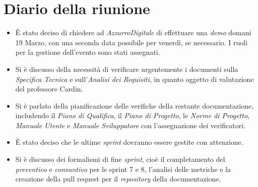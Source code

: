 
\section{Diario della riunione}

\begin{itemize}
    \item È stato deciso di chiedere ad \emph{AzzurroDigitale} di effettuare una \emph{demo} domani 19 Marzo, con una seconda data possibile per venerdì, se necessario. I ruoli per la gestione dell'evento sono stati assegnati.
    \item Si è discusso della necessità di verificare urgentemente i documenti sulla \emph{Specifica Tecnica} e sull'\emph{Analisi dei Requisiti}, in quanto oggetto di valutazione del professore Cardin.
    \item Si è parlato della pianificazione delle verifiche della restante documentazione, includendo il \emph{Piano di Qualifica}, il \emph{Piano di Progetto}, le \emph{Norme di Progetto}, \emph{Manuale Utente} e \emph{Manuale Sviluppatore} con l'assegnazione dei verificatori.
    \item È stato deciso che le ultime \emph{sprint} dovranno essere gestite con attenzione.
    \item Si è discusso dei formalismi di fine \emph{sprint}, cioè il completamento del \emph{preventivo} e \emph{consuntivo} per le sprint 7 e 8, l'analisi delle metriche e la creazione della pull request per il \emph{repository} della documentazione.
\end{itemize}
